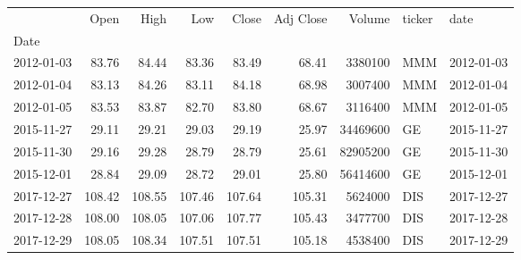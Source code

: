 \begin{tabular}{lrrrrrrll}
\toprule
{} &    Open &    High &     Low &   Close &  Adj Close &    Volume & ticker &       date \\
Date       &         &         &         &         &            &           &        &            \\
\midrule
2012-01-03 &   83.76 &   84.44 &   83.36 &   83.49 &      68.41 &   3380100 &    MMM & 2012-01-03 \\
2012-01-04 &   83.13 &   84.26 &   83.11 &   84.18 &      68.98 &   3007400 &    MMM & 2012-01-04 \\
2012-01-05 &   83.53 &   83.87 &   82.70 &   83.80 &      68.67 &   3116400 &    MMM & 2012-01-05 \\
2015-11-27 &   29.11 &   29.21 &   29.03 &   29.19 &      25.97 &  34469600 &     GE & 2015-11-27 \\
2015-11-30 &   29.16 &   29.28 &   28.79 &   28.79 &      25.61 &  82905200 &     GE & 2015-11-30 \\
2015-12-01 &   28.84 &   29.09 &   28.72 &   29.01 &      25.80 &  56414600 &     GE & 2015-12-01 \\
2017-12-27 &  108.42 &  108.55 &  107.46 &  107.64 &     105.31 &   5624000 &    DIS & 2017-12-27 \\
2017-12-28 &  108.00 &  108.05 &  107.06 &  107.77 &     105.43 &   3477700 &    DIS & 2017-12-28 \\
2017-12-29 &  108.05 &  108.34 &  107.51 &  107.51 &     105.18 &   4538400 &    DIS & 2017-12-29 \\
\bottomrule
\end{tabular}

